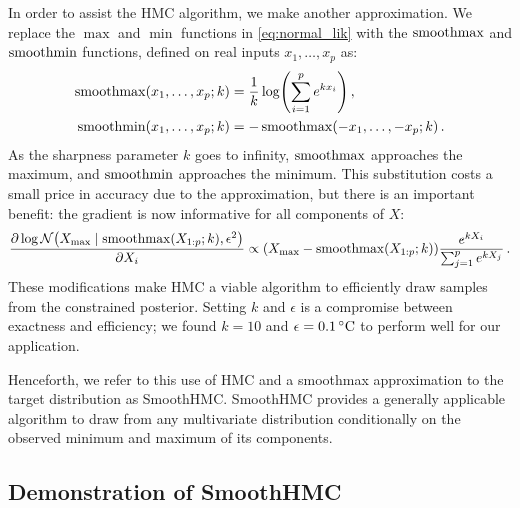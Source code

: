 \documentclass[12pt]{article}
\begin{document}
In order to assist the HMC algorithm, we make another approximation.
We replace the \(\max\) and \(\min\) functions in \autoref{eq:normal_lik} with the \(\operatorname*{smoothmax}\) and \(\operatorname*{smoothmin}\) functions, defined on real inputs \(x_1, \dotsc, x_p\) as:
\begin{equation}
\begin{split}
    \softmax\del{x_1, \dotsc, x_p ; k} &= \frac{1}{k} \log\del{\sum_{i=1}^p e^{kx_i}}\,, \\
    \softmin\del{x_1, \dotsc, x_p ; k} &= -\softmax\del{-x_1, \dotsc, -x_p; k}\,.
\end{split}
\label{eq:softmax}
\end{equation}
As the sharpness parameter \(k\) goes to infinity, \(\operatorname*{smoothmax}\) approaches the maximum, and \(\operatorname*{smoothmin}\) approaches the minimum.
This substitution costs a small price in accuracy due to the approximation, but there is an important benefit: the gradient is now informative for all components of \(X\):
\begin{equation}
\frac{\partial \log \normal\del{\Xmax \mid \softmax\del{X_{1:p} ; k}, \epsilon^2}}{\partial X_i} \propto \del{\Xmax - \softmax\del{X_{1:p} ; k}} 
        \frac{e^{k X_i}}
             {\sum_{j=1}^p e^{k X_j}} \,.
\end{equation}
These modifications make HMC a viable algorithm to efficiently draw samples from the constrained posterior.
Setting \(k\) and \(\epsilon\) is a compromise between exactness and efficiency;
we found \(k=10\) and \(\epsilon=0.1\,{}^{\circ}\mathrm{C}\) to perform well for our application.

Henceforth, we refer to this use of HMC and a smoothmax approximation to the target distribution as SmoothHMC.
SmoothHMC provides a generally applicable algorithm to draw from any multivariate distribution conditionally on the observed minimum and maximum of its components.

\subsection{Demonstration of SmoothHMC}
\label{sec:toy_example}
\end{document}
